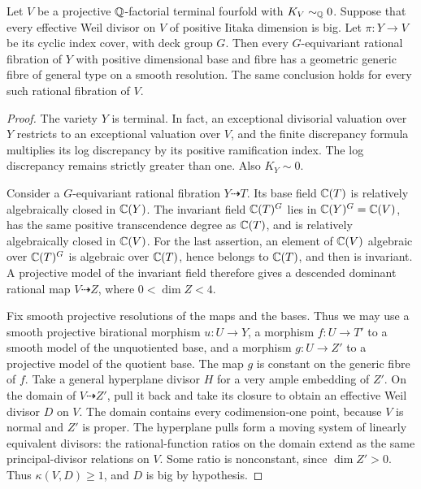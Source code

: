 \begin{lemma}\label{lem:index-general-type-fibres}
Let \(V\) be a projective \(\mathbb Q\)-factorial terminal fourfold with
\(K_V\sim_{\mathbb Q}0\).  Suppose that every effective Weil divisor on
\(V\) of positive Iitaka dimension is big.  Let
\(\pi:Y\to V\) be its cyclic index cover, with deck group \(G\).
Then every \(G\)-equivariant rational fibration of \(Y\) with positive
dimensional base and fibre has a geometric generic fibre of general
type on a smooth resolution.  The same conclusion holds for every
such rational fibration of \(V\).
\end{lemma}

\begin{proof}
The variety \(Y\) is terminal.  In fact, an exceptional divisorial
valuation over \(Y\) restricts to an exceptional valuation over \(V\),
and the finite discrepancy formula multiplies its log discrepancy
by its positive ramification index.  The log discrepancy remains
strictly greater than one.  Also \(K_Y\sim0\).

Consider a \(G\)-equivariant rational fibration \(Y\dashrightarrow T\).
Its base field \(\mathbb C(T)\) is relatively algebraically closed in
\(\mathbb C(Y)\).  The invariant field \(\mathbb C(T)^G\) lies in
\(\mathbb C(Y)^G=\mathbb C(V)\), has the same positive transcendence degree as
\(\mathbb C(T)\), and is relatively algebraically closed in \(\mathbb C(V)\).
For the last assertion, an element of \(\mathbb C(V)\) algebraic over
\(\mathbb C(T)^G\) is algebraic over \(\mathbb C(T)\), hence belongs to
\(\mathbb C(T)\), and then is invariant.  A projective model of the invariant
field therefore gives a descended dominant rational map
\(V\dashrightarrow Z\), where \(0<\dim Z<4\).

Fix smooth projective resolutions of the maps and the bases.  Thus
we may use a smooth projective birational morphism \(u:U\to Y\),
a morphism \(f:U\to T'\) to a smooth model of the unquotiented base,
and a morphism \(g:U\to Z'\) to a projective model of the quotient
base.  The map \(g\) is constant on the generic fibre of \(f\).
Take a general hyperplane divisor \(H\) for a very ample embedding
of \(Z'\).  On the domain of \(V\dashrightarrow Z'\), pull it back
and take its closure to obtain an effective Weil divisor \(D\) on
\(V\).  The domain contains every codimension-one point, because
\(V\) is normal and \(Z'\) is proper.  The hyperplane pulls form a
moving system of linearly equivalent divisors: the rational-function
ratios on the domain extend as the same principal-divisor relations
on \(V\).  Some ratio is nonconstant, since \(\dim Z'>0\).  Thus
\(\kappa(V,D)\ge1\), and \(D\) is big by hypothesis.


\end{proof}
